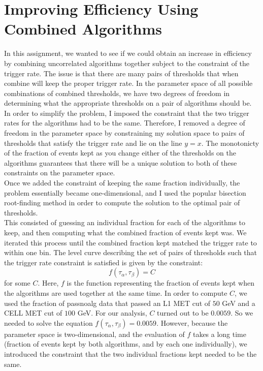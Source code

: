 \section{Improving Efficiency Using Combined Algorithms}
In this assignment, we wanted to see if we could obtain an increase in efficiency by combining uncorrelated algorithms together subject to the constraint of the trigger rate. The issue is that there are many pairs of thresholds that when combine will keep the proper trigger rate. In the parameter space of all possible combinations of combined thresholds, we have two degrees of freedom in determining what the appropriate thresholds on a pair of algorithms should be. 
In order to simplify the problem, I imposed the constraint that the two trigger rates for the algorithms had to be the same. Therefore, I removed a degree of freedom in the parameter space by constraining my solution space to pairs of thresholds that satisfy the trigger rate and lie on the line $y=x$. The monotonicty of the fraction of events kept as you change either of the thresholds on the algorithms guarantees that there will be a unique solution to both of these constraints on the parameter space. \\
Once we added the constraint of keeping the same fraction individually, the problem essentially became one-dimensional, and I used the popular bisection root-finding method in order to compute the solution to the optimal pair of thresholds. \\
This consisted of guessing an individual fraction for each of the algorithms to keep, and then computing what the combined fraction of events kept was. We iterated this process until the combined fraction kept matched the trigger rate to within one bin.
The level curve describing the set of pairs of thresholds such that the trigger rate constraint is satisfied is given by the constraint:
$$f(\tau_{\alpha},\tau_{\beta})=C$$
for some $C$. Here, $f$ is the function representing the fraction of events kept when the algorithms are used together at the same time. 
In order to compute $C$, we used the fraction of passnoalg data that passed an L1 MET cut of $50$ GeV and a CELL MET cut of $100$ GeV. 
For our analysis, $C$ turned out to be $0.0059$.
So we needed to solve the equation $f(\tau_{\alpha},\tau_{\beta})=0.0059$. 
However, because the parameter space is two-dimensional, and the evaluation of $f$ takes a long time (fraction of events kept by both algorithms, and by each one individually), we introduced the constraint that the two individual fractions kept needed to be the same.
